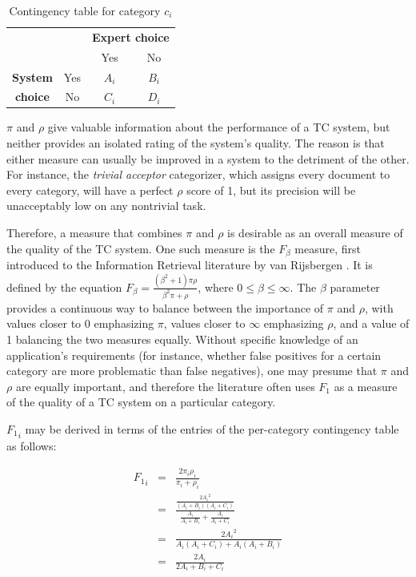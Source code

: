 \begin{table}
\begin{center}
\begin{tabular}{|c|c|c|c|}
\cline{3-4}
\multicolumn{2}{c|}{} & \multicolumn{2}{c|}{\textbf{Expert choice}} \\
\cline{3-4}
\multicolumn{2}{c|}{} & Yes & No \\
\hline
\textbf{System} & Yes & $A_i$ & $B_i$ \\
\cline{2-4}
\textbf{choice} & No  & $C_i$ & $D_i$ \\
\hline
\end{tabular}
\end{center}
\caption{Contingency table for category $c_i$}
\label{onecat-contingency}
\end{table}


$\pi$ and $\rho$ give valuable information about the performance of a
TC system, but neither provides an isolated rating of the system's
quality.  The reason is that either measure can usually be improved in
a system to the detriment of the other.\cite[p. 35]{sebastiani:02} For
instance, the \emph{trivial acceptor} categorizer, which assigns every
document to every category, will have a perfect $\rho$ score of 1, but
its precision will be unacceptably low on any nontrivial task.

Therefore, a measure that combines $\pi$ and $\rho$ is desirable as an
overall measure of the quality of the TC system.  One such measure is
the $F_\beta$ measure, first introduced to the Information Retrieval
literature by van Rijsbergen \cite[ch. 7]{rijsbergen:79}.  It is
defined by the equation $F_\beta = \frac{(\beta^2 + 1)\pi\rho}{\beta^2
\pi + \rho}$, where $0 \leq \beta \leq \infty$.  The $\beta$ parameter
provides a continuous way to balance between the importance of $\pi$
and $\rho$, with values closer to 0 emphasizing $\pi$, values closer
to $\infty$ emphasizing $\rho$, and a value of 1 balancing the two
measures equally.  Without specific knowledge of an application's
requirements (for instance, whether false positives for a certain
category are more problematic than false negatives), one may presume
that $\pi$ and $\rho$ are equally important, and therefore the
literature often uses $F_1$ as a measure of the quality of a TC system
on a particular category.

${F_1}_i$ may be derived in terms of the entries of the per-category
contingency table as follows:

\begin{eqnarray*}
{F_1}_i 
 & = & \frac{ 2 \pi_i \rho_i}{\pi_i + \rho_i} \\
 & = & \frac{ \frac{2 {A_i}^2}{(A_i+B_i)(A_i+C_i)} } { \frac{A_i}{A_i+B_i} + \frac{A_i}{A_i+C_i} } \\
 & = & \frac{ 2 {A_i}^2 }                            { A_i(A_i+C_i) + A_i(A_i+B_i) } \\
 & = & \frac{ 2 A_i }                                { 2 A_i + B_i + C_i } \\
\end{eqnarray*}

